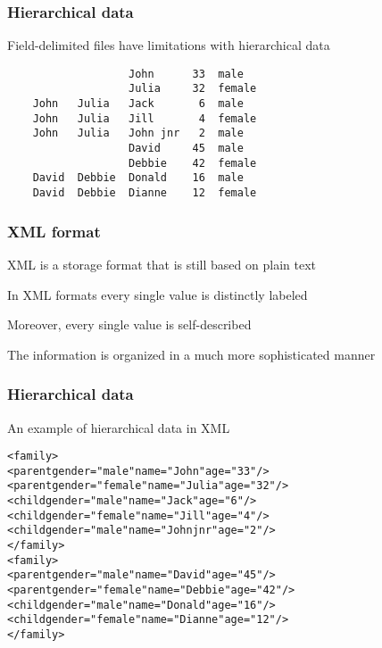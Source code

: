 \documentclass[12pt]{beamer}\usepackage[]{graphicx}\usepackage[]{color}
\makeatletter
\newcommand{\hlstr}[1]{\textcolor[rgb]{0.192,0.494,0.8}{#1}}%
\newenvironment{kframe}{%
 \def\at@end@of@kframe{}%
 \ifinner\ifhmode%
  \def\at@end@of@kframe{\end{minipage}}%
  \begin{minipage}{\columnwidth}%
 \fi\fi%
 \def\FrameCommand##1{\hskip\@totalleftmargin \hskip-\fboxsep
 \colorbox{shadecolor}{##1}\hskip-\fboxsep
     \hskip-\linewidth \hskip-\@totalleftmargin \hskip\columnwidth}%
 \MakeFramed {\advance\hsize-\width
   \@totalleftmargin\z@ \linewidth\hsize
   \@setminipage}}%
 {\par\unskip\endMakeFramed%
 \at@end@of@kframe}
\newenvironment{knitrout}{}{} %
\makeatother
\begin{document}

\begin{frame}[fragile]
\frametitle{Hierarchical data}

Field-delimited files have limitations with hierarchical data
\bigskip

\begin{verbatim}
                   John      33  male
                   Julia     32  female
    John   Julia   Jack       6  male
    John   Julia   Jill       4  female
    John   Julia   John jnr   2  male
                   David     45  male
                   Debbie    42  female
    David  Debbie  Donald    16  male
    David  Debbie  Dianne    12  female
\end{verbatim}

\end{frame}


\begin{frame}
\frametitle{XML format}

\bbi
  \item XML is a storage format that is still based on plain text
  \item In XML formats every single value is distinctly labeled
  \item Moreover, every single value is self-described
  \item The information is organized in a much more sophisticated manner
\ei
\eb

\end{frame}


\begin{frame}[fragile]
\frametitle{Hierarchical data}

An example of hierarchical data in XML
\begin{knitrout}\footnotesize
{}\color{fgcolor}\begin{kframe}
\begin{alltt}
<family>
  <parent gender=\hlstr{"male"} name=\hlstr{"John"} age=\hlstr{"33"} />
  <parent gender=\hlstr{"female"} name=\hlstr{"Julia"} age=\hlstr{"32"} />
  <child gender=\hlstr{"male"} name=\hlstr{"Jack"} age=\hlstr{"6"} />
  <child gender=\hlstr{"female"} name=\hlstr{"Jill"} age=\hlstr{"4"} />
  <child gender=\hlstr{"male"} name=\hlstr{"John jnr"} age=\hlstr{"2"} />
</family>
<family>
  <parent gender=\hlstr{"male"} name=\hlstr{"David"} age=\hlstr{"45"} />
  <parent gender=\hlstr{"female"} name=\hlstr{"Debbie"} age=\hlstr{"42"} />
  <child gender=\hlstr{"male"} name=\hlstr{"Donald"} age=\hlstr{"16"} />
  <child gender=\hlstr{"female"} name=\hlstr{"Dianne"} age=\hlstr{"12"} />
</family>
\end{alltt}
\end{kframe}
\end{knitrout}

\end{frame}
\end{document}
